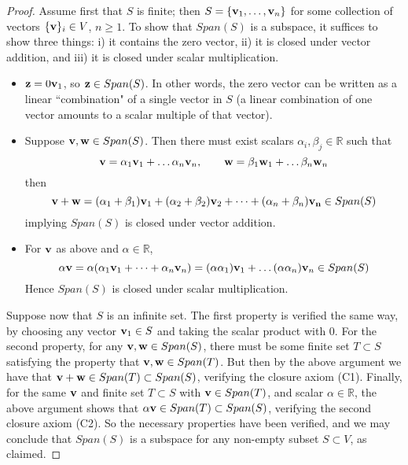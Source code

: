 \documentclass{ximera}
\begin{document}
\begin{proof} Assume first that $S$ is finite; then $S = \{ {\bf v}_1,\dots,{\bf v}_n\}$ for some collection of vectors $\{{\bf v}\}_i\in V$, $n\ge 1$. To show that $Span(S)$ is a subspace, it suffices to show three things: i) it contains the zero vector, ii) it is closed under vector addition, and iii) it is closed under scalar multiplication.
\begin{itemize}
\item ${\bf z} = 0{\bf v}_1$, so ${\bf z}\in Span(S)$. In other words, the zero vector can be written as a linear ``combination" of a single vector in $S$ (a linear combination of one vector amounts to a scalar multiple of that vector).
\item {\bf{}} Suppose ${\bf v}, {\bf w}\in Span(S)$. Then there must exist scalars $\alpha_i, \beta_j\in \mathbb R$ such that
\[
{\bf v} = \alpha_1{\bf v}_1 +\dots \alpha_n{\bf v}_n,\qquad {\bf w} = \beta_1{\bf w}_1+\dots \beta_n{\bf w}_n
\]
then
\[
{\bf v} + {\bf w} = (\alpha_1 + \beta_1){\bf v}_1 + (\alpha_2 + \beta_2){\bf v}_2 +\dots + (\alpha_n+\beta_n){\bf v_n}\in Span(S)
\]
implying $Span(S)$ is closed under vector addition.
\item {\bf{}} For ${\bf v}$ as above and $\alpha\in\mathbb R$,
\[
\alpha{\bf v} = \alpha(\alpha_1{\bf v}_1 + \dots + \alpha_n{\bf v}_n) = (\alpha\alpha_1){\bf v}_1 + \dots (\alpha\alpha_n){\bf v}_n\in Span(S)
\]
Hence $Span(S)$ is closed under scalar multiplication.
\end{itemize}

Suppose now that $S$ is an infinite set. The first property is verified the same way, by choosing any vector ${\bf v}_1\in S$ and taking the scalar product with $0$. For the second property, for any ${\bf v},{\bf w}\in Span(S)$, there must be some finite set $T\subset S$ satisfying the property that ${\bf v}, {\bf w}\in Span(T)$. But then by the above argument we have that ${\bf v}+ {\bf w}\in Span(T)\subset Span(S)$, verifying the closure axiom (C1). Finally, for the same $\bf v$ and finite set $T\subset S$ with ${\bf v}\in Span(T)$, and scalar $\alpha\in\mathbb R$, the above argument shows that $\alpha{\bf v}\in Span(T)\subset Span(S)$, verifying the second closure axiom (C2). So the necessary properties have been verified, and we may conclude that $Span(S)$ is a subspace for any non-empty subset $S\subset V$, as claimed.

\end{proof}
\end{document}
